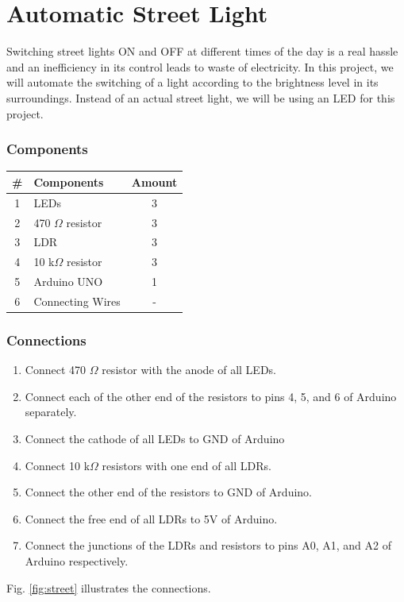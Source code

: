 \chapter{Automatic Street Light}

Switching street lights ON and OFF at different times of the day is a real hassle and an inefficiency in its control leads to waste of electricity. In this project, we will automate the switching of a light according to the brightness level in its surroundings. Instead of an actual street light, we will be using an LED for this project.

\subsection*{Components}
\begin{table}[H]
    \centering
    \begin{tabular}{|c|l|c|}\hline
     \textbf{\#} & \textbf{Components}  & \textbf{Amount}\\\hline
     1 & LEDs                               & 3\\\hline
     2 & 470 $\Omega$ resistor              & 3\\\hline
     3 & LDR     & 3 \\\hline
     4 & 10 k$\Omega$ resistor              & 3\\\hline
     5 & Arduino UNO                        & 1 \\\hline
     6 & Connecting Wires                   & - \\\hline
    \end{tabular}
\end{table}

\subsection*{Connections}

\begin{enumerate}[leftmargin=*]
    \item Connect 470 $\Omega$ resistor with the anode of all LEDs. 
    \item Connect each of the other end of the resistors to pins 4, 5, and 6 of Arduino separately.
    \item Connect the cathode of all LEDs to GND of Arduino
    \item Connect 10 k$\Omega$ resistors with one end of all LDRs. 
    \item Connect the other end of the resistors to GND of Arduino. 
    \item Connect the free end of all LDRs to 5V of Arduino.
    \item Connect the junctions of the LDRs and resistors to pins A0, A1, and A2 of Arduino respectively. 

\end{enumerate}
Fig. \ref{fig:street} illustrates the connections.

